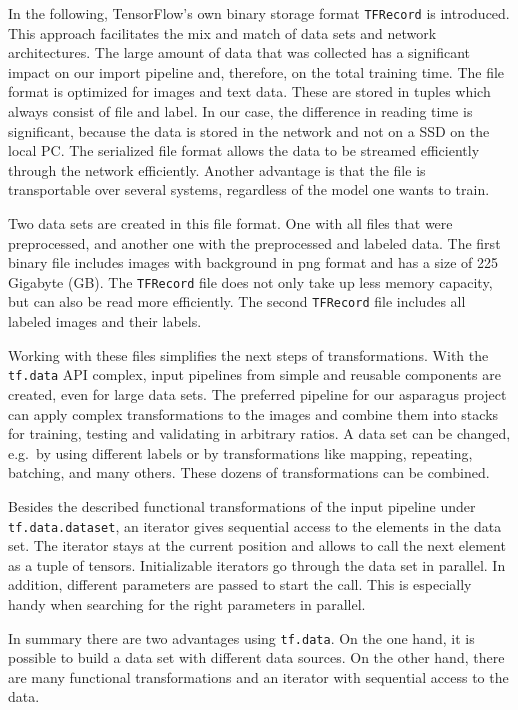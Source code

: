 In the following, TensorFlow's own binary storage format \texttt{TFRecord} is introduced. This approach facilitates the mix and match of data sets and network architectures. The large amount of data that was collected has a significant impact on our import pipeline and, therefore, on the total training time. The file format is optimized for images and text data. These are stored in tuples which always consist of file and label. In our case, the difference in reading time is significant, because the data is stored in the network and not on a SSD on the local PC. The serialized file format allows the data to be streamed efficiently through the network efficiently. Another advantage is that the file is transportable over several systems, regardless of the model one wants to train.

Two data sets are created in this file format. One with all files that were preprocessed, and another one with the preprocessed and labeled data.
The first binary file includes images with background in png format and has a size of 225 Gigabyte (GB). The \texttt{TFRecord} file does not only take up less memory capacity, but can also be read more efficiently. The second \texttt{TFRecord} file includes all labeled images and their labels.

Working with these files simplifies the next steps of transformations. With the \mbox{\texttt{tf.data}} API complex, input pipelines from simple and reusable components are created, even for large data sets. The preferred pipeline for our asparagus project can apply complex transformations to the images and combine them into stacks for training, testing and validating in arbitrary ratios. A data set can be changed, e.g.\ by using different labels or by transformations like mapping, repeating, batching, and many others. These dozens of transformations can be combined.

Besides the described functional transformations of the input pipeline under \mbox{\texttt{tf.data.dataset}}, an iterator gives sequential access to the elements in the data set. The iterator stays at the current position and allows to call the next element as a tuple of tensors. Initializable iterators go through the data set in parallel. In addition, different parameters are passed to start the call. This is especially handy when searching for the right parameters in parallel.

In summary there are two advantages using \texttt{tf.data}. On the one hand, it is possible to build a data set with different data sources. On the other hand, there are many functional transformations and an iterator with sequential access to the data.

